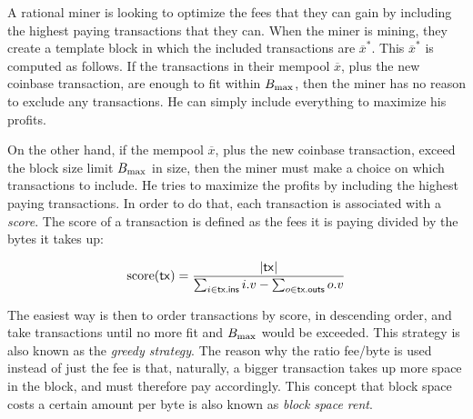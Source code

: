 A rational miner is looking to optimize the fees that they can gain by including the highest
paying transactions that they can. When the miner is mining, they create a template block
in which the included transactions are $\overline{x}^*$. This $\overline{x}^*$ is computed
as follows. If the transactions in their mempool $\overline{x}$, plus
the new coinbase transaction, are enough to fit within $B_\mathrm{max}$, then the miner has no reason
to exclude any transactions. He can simply include everything to maximize his profits.

On the other hand, if the mempool $\overline{x}$, plus the new coinbase transaction, exceed
the block size limit $B_\mathrm{max}$ in size, then the miner must make a choice on which transactions
to include. He tries to maximize the profits by including the highest paying transactions.
In order to do that, each transaction is associated with a \emph{score}.
The score of a transaction is defined as the fees it is paying divided by the bytes it takes up:

\[
    \mathrm{score}(\mathsf{tx}) = \frac{|\mathsf{tx}|}{\sum_{i \in \mathsf{tx}\textsf{.ins}} i.v - \sum_{o \in \mathsf{tx}\textsf{.outs}} o.v}
\]

The easiest way is then to order transactions by score, in descending order, and take
transactions until no more fit and $B_\mathrm{max}$ would be exceeded. This strategy is also known
as the \emph{greedy strategy}. The reason why the ratio fee/byte
is used instead of just the fee is that, naturally, a bigger transaction takes up more space in
the block, and must therefore pay accordingly. This concept that block space costs a certain
amount per byte is also known as \emph{block space rent}.


